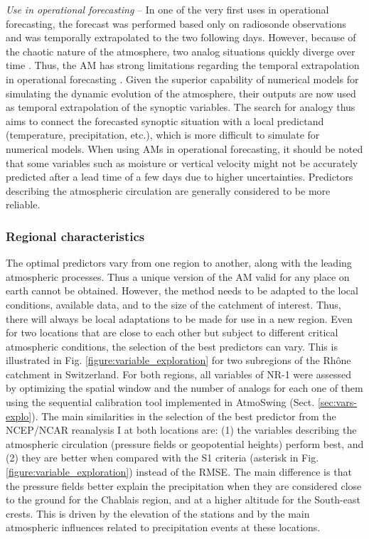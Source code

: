 \documentclass[gmd]{copernicus}
\begin{document}
\textit{Use in operational forecasting} -- In one of the very first uses in operational forecasting, the forecast was performed based only on radiosonde observations and was temporally extrapolated to the two following days. However, because of the chaotic nature of the atmosphere, two analog situations quickly diverge over time \citep{Lorenz1969}. Thus, the AM has strong limitations regarding the temporal extrapolation in operational forecasting \citep{Bontron2004}. Given the superior capability of numerical models for simulating the dynamic evolution of the atmosphere, their outputs are now used as temporal extrapolation of the synoptic variables. The search for analogy thus aims to connect the forecasted synoptic situation with a local predictand (temperature, precipitation, etc.), which is more difficult to simulate for numerical models. When using AMs in operational forecasting, it should be noted that some variables such as moisture or vertical velocity might not be accurately predicted after a lead time of a few days due to higher uncertainties. Predictors describing the atmospheric circulation are generally considered to be more reliable.


\subsubsection{Regional characteristics}

The optimal predictors vary from one region to another, along with the leading atmospheric processes. Thus a unique version of the AM valid for any place on earth cannot be obtained. However, the method needs to be adapted to the local conditions, available data, and to the size of the catchment of interest. Thus, there will always be local adaptations to be made for use in a new region. Even for two locations that are close to each other but subject to different critical atmospheric conditions, the selection of the best predictors can vary. This is illustrated in Fig. \ref{figure:variable_exploration} for two subregions of the Rh\^{o}ne catchment in Switzerland. For both regions, all variables of NR-1 were assessed by optimizing the spatial window and the number of analogs for each one of them using the sequential calibration tool implemented in AtmoSwing (Sect. \ref{sec:vars-explo}). The main similarities in the selection of the best predictor from the NCEP/NCAR reanalysis I at both locations are: (1) the variables describing the atmospheric circulation (pressure fields or geopotential heights) perform best, and (2) they are better when compared with the S1 criteria (asterisk in Fig. \ref{figure:variable_exploration}) instead of the RMSE. The main difference is that the pressure fields better explain the precipitation when they are considered close to the ground for the Chablais region, and at a higher altitude for the South-east crests. This is driven by the elevation of the stations and by the main atmospheric influences related to precipitation events at these locations. 
\end{document}
